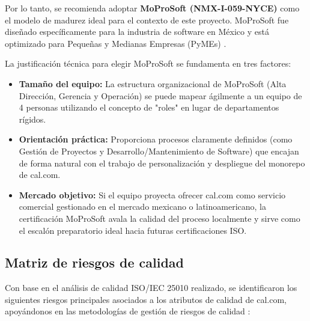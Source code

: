 \documentclass[12pt, a4paper]{article}
\begin{document}
Por lo tanto, se recomienda adoptar \textbf{MoProSoft (NMX-I-059-NYCE)} como el modelo de madurez ideal para el contexto de este proyecto. MoProSoft fue diseñado específicamente para la industria de software en México y está optimizado para Pequeñas y Medianas Empresas (PyMEs) \parencite{oktaba2008}.

La justificación técnica para elegir MoProSoft se fundamenta en tres factores:
\begin{itemize}
\item \textbf{Tamaño del equipo:} La estructura organizacional de MoProSoft (Alta Dirección, Gerencia y Operación) se puede mapear ágilmente a un equipo de 4 personas utilizando el concepto de "roles" en lugar de departamentos rígidos.
\item \textbf{Orientación práctica:} Proporciona procesos claramente definidos (como Gestión de Proyectos y Desarrollo/Mantenimiento de Software) que encajan de forma natural con el trabajo de personalización y despliegue del monorepo de cal.com.
\item \textbf{Mercado objetivo:} Si el equipo proyecta ofrecer cal.com como servicio comercial gestionado en el mercado mexicano o latinoamericano, la certificación MoProSoft avala la calidad del proceso localmente y sirve como el escalón preparatorio ideal hacia futuras certificaciones ISO.
\end{itemize}

\subsection{Matriz de riesgos de calidad}

Con base en el análisis de calidad ISO/IEC 25010 realizado, se identificaron los siguientes riesgos principales asociados a los atributos de calidad de cal.com, apoyándonos en las metodologías de gestión de riesgos de calidad \parencite{galin2018}:
\end{document}
